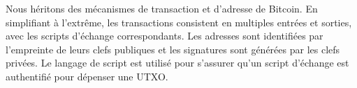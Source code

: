 \documentclass[a4,twocolumn,10pt]{article}
\theoremstyle{definition}
\begin{document}
%
%
%    
%
Nous héritons des mécanismes de transaction et d'adresse de Bitcoin. En simplifiant à l'extrême, les transactions consistent en multiples entrées et sorties, avec les scripts d'échange correspondants.
Les adresses sont identifiées par l'empreinte de leurs clefs publiques et les signatures sont générées par les clefs privées.
Le langage de script est utilisé pour s'assurer qu'un script d'échange est authentifié pour dépenser une UTXO\@.
\end{document}

